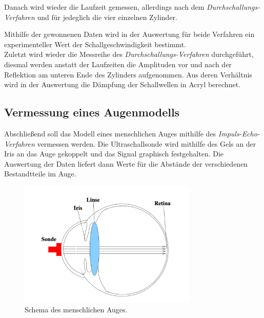 Danach wird wieder die Laufzeit gemessen, allerdings nach dem \textit{Durchschallungs-Verfahren} und für jedeglich die
vier einzelnen Zylinder.

Mithilfe der gewonnenen Daten wird in der Auswertung für beide Verfahren ein experimenteller Wert der Schallgeschwindigkeit bestimmt. \\

Zuletzt wird wieder die Messreihe des \textit{Durchschallungs-Verfahren} durchgeführt, diesmal werden anstatt der Laufzeiten die
Amplituden vor und nach der Reflektion am unteren Ende des Zylinders aufgenommen.
Aus deren Verhältnis wird in der Auswertung die Dämpfung der Schallwellen in Acryl berechnet.

\subsection{Vermessung eines Augenmodells}

Abschließend soll das Modell eines menschlichen Auges mithilfe des \textit{Impuls-Echo-Verfahren} vermessen werden.
Die Ultraschallsonde wird mithilfe des Gels an der Iris an das Auge gekoppelt und das Signal graphisch festgehalten.
Die Auswertung der Daten liefert dann Werte für die Abstände der verschiedenen Bestandtteile im Auge.
\begin{figure}
    \centering
    \includegraphics[height=6cm]{content/Abbildungen/Schema_Auge.pdf}
    \caption{Schema des menschlichen Auges.\cite{US1}}
    \label{fig:Schema Auge}
\end{figure}
